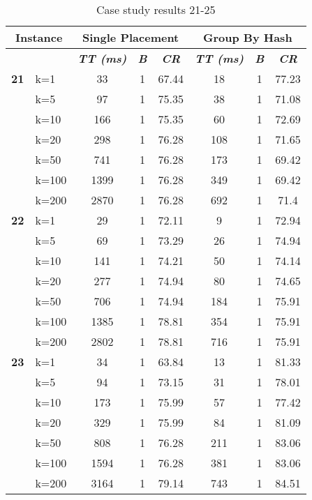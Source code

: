     \begin{table}[htbp]
    \caption{Case study results 21-25}
    \centering
    \begin{tabular}{|l|l|c|c|c|c|c|c|}
    \hline
    \multicolumn{ 2}{|c|}{\textbf{Instance}} & \multicolumn{ 3}{c|}{\textbf{Single Placement}} & \multicolumn{ 3}{c|}{\textbf{Group By Hash}} \\ \hline
    \multicolumn{ 2}{|l|}{} & \textbf{\textit{TT (ms)}} & \textbf{\textit{B}} & \textbf{\textit{CR}} & \textbf{\textit{TT (ms)}} & \textbf{\textit{B}} & \textbf{\textit{CR}} \\ \hline
    \multicolumn{1}{|r|}{\textbf{21}} & k=1 & 33 & 1 & 67.44 & 18 & 1 & 77.23 \\ 
     & k=5 & 97 & 1 & 75.35 & 38 & 1 & 71.08 \\ 
     & k=10 & 166 & 1 & 75.35 & 60 & 1 & 72.69 \\ 
     & k=20 & 298 & 1 & 76.28 & 108 & 1 & 71.65 \\ 
     & k=50 & 741 & 1 & 76.28 & 173 & 1 & 69.42 \\ 
     & k=100 & 1399 & 1 & 76.28 & 349 & 1 & 69.42 \\ 
     & k=200 & 2870 & 1 & 76.28 & 692 & 1 & 71.4 \\ \hline
    \multicolumn{1}{|r|}{\textbf{22}} & k=1 & 29 & 1 & 72.11 & 9 & 1 & 72.94 \\ 
     & k=5 & 69 & 1 & 73.29 & 26 & 1 & 74.94 \\ 
     & k=10 & 141 & 1 & 74.21 & 50 & 1 & 74.14 \\ 
     & k=20 & 277 & 1 & 74.94 & 80 & 1 & 74.65 \\ 
     & k=50 & 706 & 1 & 74.94 & 184 & 1 & 75.91 \\ 
     & k=100 & 1385 & 1 & 78.81 & 354 & 1 & 75.91 \\ 
     & k=200 & 2802 & 1 & 78.81 & 716 & 1 & 75.91 \\ \hline
    \multicolumn{1}{|r|}{\textbf{23}} & k=1 & 34 & 1 & 63.84 & 13 & 1 & 81.33 \\ 
     & k=5 & 94 & 1 & 73.15 & 31 & 1 & 78.01 \\ 
     & k=10 & 173 & 1 & 75.99 & 57 & 1 & 77.42 \\ 
     & k=20 & 329 & 1 & 75.99 & 84 & 1 & 81.09 \\ 
     & k=50 & 808 & 1 & 76.28 & 211 & 1 & 83.06 \\ 
     & k=100 & 1594 & 1 & 76.28 & 381 & 1 & 83.06 \\ 
     & k=200 & 3164 & 1 & 79.14 & 743 & 1 & 84.51 \\ \hline

\end{tabular}
\end{table}
